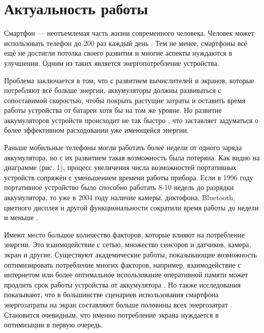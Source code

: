 \documentclass[a4paper,14pt]{extarticle} %
\begin{document}
	
	
	\newpage
	\tableofcontents
	\newpage
	
	
	
	\newpage
	\section{Актуальность работы}
	
	Смартфон — неотъемлемая часть жизни современного человека. Человек может использовать телефон до 200 раз каждый день \parencite{falaki2010diversity}. Тем не менее, смартфоны всё ещё не достигли потолка своего развития и многие аспекты нуждаются в улучшении. Одним из таких является энергопотребление устройства.
	
	Проблема заключается в том, что с развитием вычислителей и экранов, которые потребляют всё больше энергии, аккумуляторы должны развиваться с сопоставимой скоростью, чтобы покрыть растущие затраты и оставить время работы устройства от батареи хотя бы на том же уровне. Но развитие аккумуляторов устройств происходит не так быстро \parencite{pentikousis2010search}, что заставляет задуматься о более эффективном расходовании уже имеющейся энергии.
	
	Раньше мобильные телефоны могли работать более недели от одного заряда аккумулятора, но с их развитием такая возможность была потеряна. Как видно на диаграмме (рис. 1), процесс увеличения числа возможностей портативных устройств сопряжён с уменьшением времени работы прибора. Если в 1996 году портативное устройство было способно работать 8-10 недель до разрядки аккумулятора, то уже в 2004 году наличие камеры, диктофона, Bluetooth, цветного дисплея и другой функциональности сократили время работы до недели и меньше \parencite{василенко2005методы}.
	
	Имеют место большое количество факторов, которые влияют на потребление энергии. Это взаимодействие с сетью, множество сенсоров и датчиков, камера, экран и другие. Существуют академические работы, показывающие возможность оптимизировать потребление многих факторов, например, взаимодействие с интернетом \parencite{tuysuz2019real} или более оптимальное использование оперативной памяти может продлить срок работы устройства от аккумулятора \parencite{li2014investigation}. Но также исследования показывают, что в большинстве сценариев использования смартфона энергозатраты на экран составляют больше половины всех энергозатрат \parencite{bai2013android}. Становится очевидным, что именно потребление экрана нуждается в оптимизации в первую очередь.
	
\end{document}
